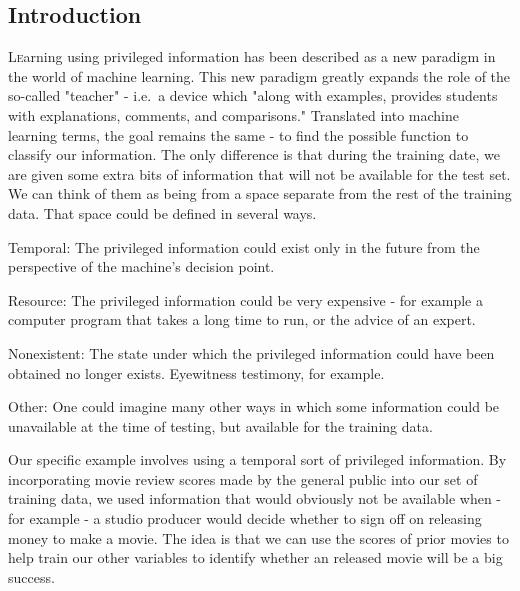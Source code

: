 \documentclass[twoside]{article}\usepackage[]{graphicx}\usepackage[]{color}
\begin{document}
\begin{multicols}{2} %

\section{Introduction}

\lettrine[nindent=0em,lines=3]{L} earning using privileged information has been
described as a new paradigm in the world of machine learning.\cite{Vapnik2009544}
This new paradigm greatly expands the role of the so-called "teacher" - i.e.\ a device which "along with
examples, provides students with explanations, comments, and comparisons."
Translated into machine learning terms, the goal remains the same - to find the
possible function to classify our information. The only difference is that during
the training date, we are given some extra bits of information that will not be
available for the test set. We can think of them as being from a space separate
from the rest of the training data. That space could be defined in several ways.

\begin{compactitem}
\item Temporal: The privileged information could exist only in the
  future from the perspective of the machine's decision point.
\item Resource: The privileged information could be very expensive -
  for example a computer program that takes a long time to run, or the advice of an expert.
\item Nonexistent: The state under which the privileged information could
  have been obtained no longer exists. Eyewitness testimony, for example.
\item Other: One could imagine many other ways in which some information could
  be unavailable at the time of testing, but available for the training data.
\end{compactitem}

Our specific example involves using a temporal sort of privileged information.
By incorporating movie review scores made by the general public into our set of
training data, we used information that would obviously not be available when - 
for example - a studio producer would decide whether to sign off on releasing
money to make a movie. The idea is that we can use the scores of prior movies to 
help train our other variables to identify whether an released movie will be a
big success.


\end{multicols}
\end{document}
